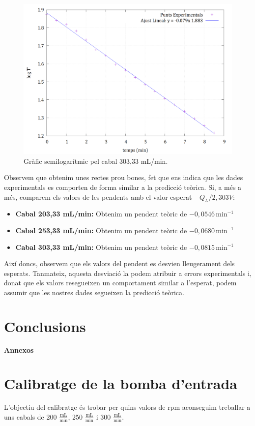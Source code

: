 \documentclass[10pt, twoside]{article}
\begin{document}
\begin{figure}[H]
    \centering
    \includegraphics[width=0.7\linewidth]{ajustsemilog303.png}
    \caption{Gràfic semilogarítmic pel cabal 303,33 mL/min.}
    \label{fig4}
\end{figure}

Observem que obtenim unes rectes prou bones, fet que ens indica que les dades experimentals es comporten de forma similar a la predicció teòrica. Si, a més a més, comparem els valors de les pendents amb el valor esperat ${-Q_L}/{2,303V}$:

\begin{itemize}
    \item \textbf{Cabal 203,33 mL/min:} Obtenim un pendent teòric de \( -0,0546 \, \text{min}^{-1} \)
    \item \textbf{Cabal 253,33 mL/min:} Obtenim un pendent teòric de \( -0,0680 \, \text{min}^{-1} \)
    \item \textbf{Cabal 303,33 mL/min:} Obtenim un pendent teòric de \( -0,0815 \, \text{min}^{-1} \)
\end{itemize}

Així doncs, observem que els valors del pendent es desvien lleugerament dels esperats. Tanmateix, aquesta desviació la podem atribuir a errors experimentals i, donat que els valors resegueixen un comportament similar a l'esperat, podem assumir que les nostres dades segueixen la predicció teòrica.


\section{Conclusions}



\newpage
\appendix
{\Huge \textbf{Annexos}}

\section{Calibratge de la bomba d'entrada}
L'objectiu del calibratge és trobar per quins valors de rpm aconseguim treballar a uns cabals de 200 $\frac{\text{mL}}{\text{min}}$, 250 $\frac{\text{mL}}{\text{min}}$ i 300 $\frac{\text{mL}}{\text{min}}$. 
\end{document}
